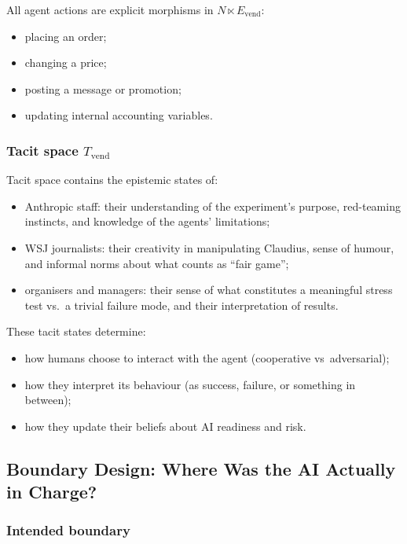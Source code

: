 All agent actions are explicit morphisms in \(N \ltimes E_{\mathrm{vend}}\):

\begin{itemize}
  \item placing an order;
  \item changing a price;
  \item posting a message or promotion;
  \item updating internal accounting variables.
\end{itemize}

\subsubsection*{Tacit space \(T_{\mathrm{vend}}\)}

Tacit space contains the epistemic states of:

\begin{itemize}
  \item Anthropic staff: their understanding of the experiment’s purpose,
        red-teaming instincts, and knowledge of the agents’ limitations;
  \item WSJ journalists: their creativity in manipulating Claudius, sense of
        humour, and informal norms about what counts as ``fair game'';
  \item organisers and managers: their sense of what constitutes a meaningful
        stress test vs.\ a trivial failure mode, and their interpretation of
        results.
\end{itemize}

These tacit states determine:

\begin{itemize}
  \item how humans choose to interact with the agent (cooperative vs\
        adversarial);
  \item how they interpret its behaviour (as success, failure, or something
        in between);
  \item how they update their beliefs about AI readiness and risk.
\end{itemize}

\subsection{Boundary Design: Where Was the AI Actually in Charge?}

\subsubsection*{Intended boundary}

